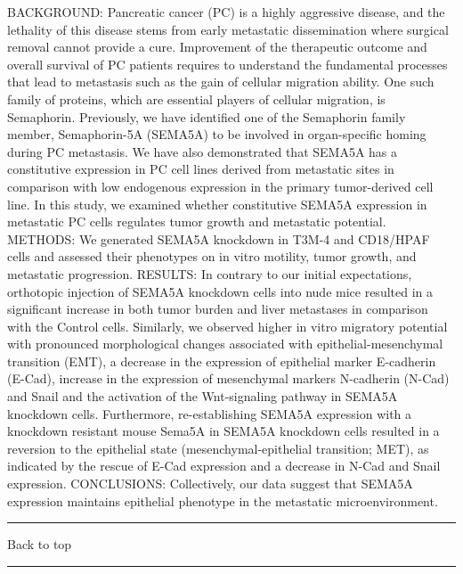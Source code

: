\documentclass[]{article}
\begin{document}
BACKGROUND: Pancreatic cancer (PC) is a highly aggressive disease, and
the lethality of this disease stems from early metastatic dissemination
where surgical removal cannot provide a cure. Improvement of the
therapeutic outcome and overall survival of PC patients requires to
understand the fundamental processes that lead to metastasis such as the
gain of cellular migration ability. One such family of proteins, which
are essential players of cellular migration, is Semaphorin. Previously,
we have identified one of the Semaphorin family member, Semaphorin-5A
(SEMA5A) to be involved in organ-specific homing during PC metastasis.
We have also demonstrated that SEMA5A has a constitutive expression in
PC cell lines derived from metastatic sites in comparison with low
endogenous expression in the primary tumor-derived cell line. In this
study, we examined whether constitutive SEMA5A expression in metastatic
PC cells regulates tumor growth and metastatic potential. METHODS: We
generated SEMA5A knockdown in T3M-4 and CD18/HPAF cells and assessed
their phenotypes on in vitro motility, tumor growth, and metastatic
progression. RESULTS: In contrary to our initial expectations,
orthotopic injection of SEMA5A knockdown cells into nude mice resulted
in a significant increase in both tumor burden and liver metastases in
comparison with the Control cells. Similarly, we observed higher in
vitro migratory potential with pronounced morphological changes
associated with epithelial-mesenchymal transition (EMT), a decrease in
the expression of epithelial marker E-cadherin (E-Cad), increase in the
expression of mesenchymal markers N-cadherin (N-Cad) and Snail and the
activation of the Wnt-signaling pathway in SEMA5A knockdown cells.
Furthermore, re-establishing SEMA5A expression with a knockdown
resistant mouse Sema5A in SEMA5A knockdown cells resulted in a reversion
to the epithelial state (mesenchymal-epithelial transition; MET), as
indicated by the rescue of E-Cad expression and a decrease in N-Cad and
Snail expression. CONCLUSIONS: Collectively, our data suggest that
SEMA5A expression maintains epithelial phenotype in the metastatic
microenvironment.

{}

{}

\begin{center}\rule{0.5\linewidth}{\linethickness}\end{center}

Back to top

\begin{center}\rule{0.5\linewidth}{\linethickness}\end{center}
\end{document}
